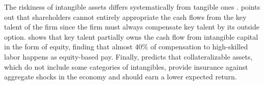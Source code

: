 \documentclass[12pt, letterpaper]{article}
\begin{document}
%
%

The riskiness of intangible assets differs systematically from tangible ones \citep{Hansen2005-xe}. \cite{Eisfeldt2013-ad} points out that shareholders cannot entirely appropriate the cash flows from the key talent of the firm since the firm must always compensate key talent by its outside option. \cite{Eisfeldt2018-iy} shows that key talent partially owns the cash flow from intangible capital in the form of equity, finding that almost 40\% of compensation to high-skilled labor happens as equity-based pay. Finally, \cite{Ai2019-wd} predicts that collateralizable assets, which do not include some categories of intangibles, provide insurance against aggregate shocks in the economy and should earn a lower expected return.
\end{document}
